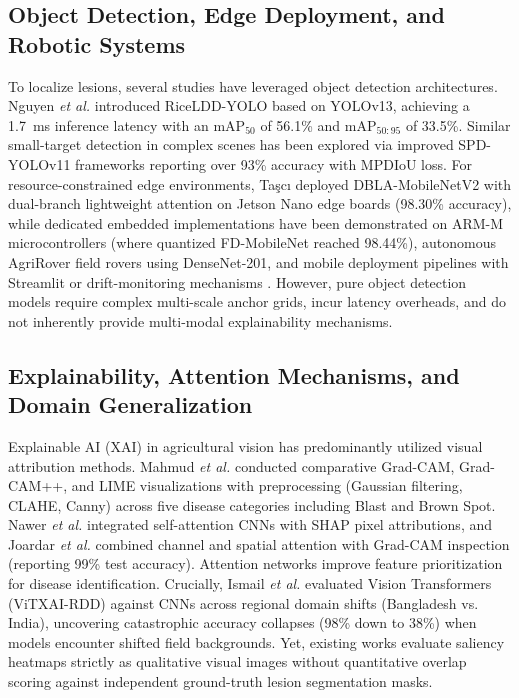 \documentclass[conference]{IEEEtran}
\begin{document}
\subsection{Object Detection, Edge Deployment, and Robotic Systems}
To localize lesions, several studies have leveraged object detection architectures. Nguyen \textit{et al.} \cite{ref1} introduced RiceLDD-YOLO based on YOLOv13, achieving a 1.7~ms inference latency with an $\text{mAP}_{50}$ of 56.1\% and $\text{mAP}_{50:95}$ of 33.5\%. Similar small-target detection in complex scenes has been explored via improved SPD-YOLOv11 frameworks \cite{ref12} reporting over 93\% accuracy with MPDIoU loss. For resource-constrained edge environments, Taşcı \cite{ref3} deployed DBLA-MobileNetV2 with dual-branch lightweight attention on Jetson Nano edge boards (98.30\% accuracy), while dedicated embedded implementations have been demonstrated on ARM-M microcontrollers \cite{ref14} (where quantized FD-MobileNet reached 98.44\%), autonomous AgriRover field rovers \cite{ref18} using DenseNet-201, and mobile deployment pipelines with Streamlit \cite{ref9} or drift-monitoring mechanisms \cite{ref8}. However, pure object detection models require complex multi-scale anchor grids, incur latency overheads, and do not inherently provide multi-modal explainability mechanisms.

\subsection{Explainability, Attention Mechanisms, and Domain Generalization}
Explainable AI (XAI) in agricultural vision has predominantly utilized visual attribution methods. Mahmud \textit{et al.} \cite{ref4} conducted comparative Grad-CAM, Grad-CAM++, and LIME visualizations with preprocessing (Gaussian filtering, CLAHE, Canny) across five disease categories including Blast and Brown Spot. Nawer \textit{et al.} \cite{ref5} integrated self-attention CNNs with SHAP pixel attributions, and Joardar \textit{et al.} \cite{ref7} combined channel and spatial attention with Grad-CAM inspection (reporting 99\% test accuracy). Attention networks \cite{ref20} improve feature prioritization for disease identification. Crucially, Ismail \textit{et al.} \cite{ref6} evaluated Vision Transformers (ViTXAI-RDD) against CNNs across regional domain shifts (Bangladesh vs. India), uncovering catastrophic accuracy collapses (98\% down to 38\%) when models encounter shifted field backgrounds. Yet, existing works evaluate saliency heatmaps strictly as qualitative visual images without quantitative overlap scoring against independent ground-truth lesion segmentation masks.
\end{document}
